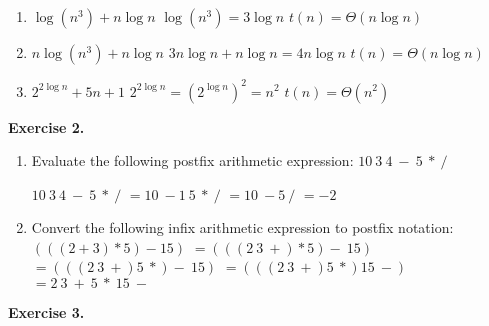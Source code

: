\documentclass[12pt,letterpaper,final]{report}
\begin{document}
\begin{enumerate}
\item $\log(n^3) + n \log n$
\newline $ \log (n^3) = 3 \log n $
\newline $t(n) = \Theta(n \log n)$

\item $n \log (n^3) + n \log n$
\newline $ 3n \log n + n \log n = 4n \log n $
\newline $t(n) = \Theta(n \log n)$

\item $2^{2 \log n} + 5n +1$
\newline $2^{2 \log n} = (2^{\log n})^2 = n^2$
\newline $t(n) = \Theta(n^{2})$

\end{enumerate}
\bigskip


\textbf{Exercise 2.}  
\begin{enumerate}
\item Evaluate the following postfix arithmetic expression:  $10~3~4~-~5~*~/$

\newline $10~3~4~-~5~*~/$
\newline $ = 10~-1~5~*~/ $
\newline $ = 10~-5~/ $
\newline $ = -2 $



\item Convert the following infix arithmetic expression to postfix notation: $(((2+3)*5)-15)$
\newline 
\newline $= (((2~3~+)*5)-~15)$
\newline $= (((2~3~+) 5~*)-~15)$
\newline $= (((2~3~+) 5~*) 15~-)$
\newline $= 2~3~+~5~*~15~- $



\end{enumerate}

\bigskip


\textbf{Exercise 3.}
\end{document}
